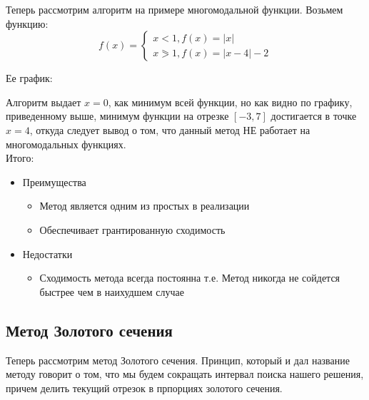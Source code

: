 \documentclass[a4paper, 14pt]{article}
\begin{document}
	Теперь рассмотрим алгоритм на примере многомодальной функции. Возьмем функцию:
	\begin{equation*}
		f(x) =
		\begin{cases}
			x < 1, f(x) = |x|\\
			x \eqslantgtr 1, f(x) = |x - 4| - 2
		\end{cases}
	\end{equation*}

	Ее график:
	\\



	Алгоритм выдает $x = 0$, как минимум всей функции, но как видно по графику, приведенному выше, минимум функции на отрезке $[-3, 7]$ достигается в точке $x = 4$, откуда следует вывод о том, что данный метод НЕ работает на многомодальных функциях. \\
	
	Итого: 
	\begin{itemize}
		\item Преимущества
			\begin{itemize}
				\item Метод является одним из простых в реализации
				\item Обеспечивает грантированную сходимость
			\end{itemize}
		\item Недостатки
			\begin{itemize}
			\item Сходимость метода всегда постоянна т.е. Метод никогда не сойдется быстрее чем в наихудшем случае
			\end{itemize}
	\end{itemize}
	
	\subsection*{Метод Золотого сечения}
	Теперь рассмотрим метод Золотого сечения. Принцип, который и дал название методу говорит о том, что мы будем сокращать интервал поиска нашего решения, причем делить текущий отрезок в прпорциях золотого сечения.
	
\end{document}
